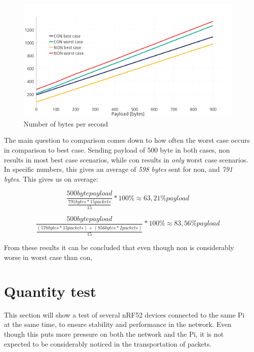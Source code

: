 \begin{figure}[ht]
    \centering
    \includegraphics[scale=1.0]{bestCaseworstCase2.png}    
    \caption{Number of bytes per second}
    \label{fig:bestCaseworstCase}
\end{figure}

The main question to comparison comes down to how often the worst case occurs in comparison to best case. Sending payload of 500 byte in both cases, \gls{non} results in most best case scenarios, while \gls{con} results in \textit{only} worst case scenarios. In specific numbers, this gives an average of \textit{598 bytes} sent for \gls{non}, and \textit{791 bytes}. This gives us on average: 

\begin{equation} \label{bestWorstEquation}
	\frac{500 byte payload}{\frac{791 bytes * 15 packets}{15}}*100 \% \approx 63,21 \% payload
\end{equation}

\begin{equation} \label{bestWorstEquation2}
\frac{500 byte payload}{\frac{(576 bytes * 13 packets)+(856 bytes * 2 packets)}{15}}*100 \% \approx 83,56 \% payload
\end{equation}

From these results it can be concluded that even though \gls{non} is considerably worse in worst case than \gls{con}, 






\section{Quantity test} 

This section will show a test of several nRF52 devices connected to the same Pi at the same time, to ensure stability and performance in the network. Even though this puts more pressure on both the network and the Pi, it is not expected to be considerably noticed in the transportation of packets. 


